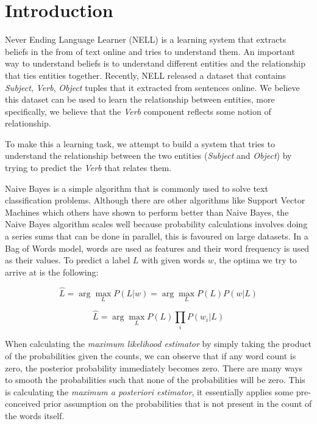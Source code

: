 \section{Introduction}

Never Ending Language Learner (NELL) is a learning system that extracts beliefs in the from of text online and tries to understand them. An important way to understand beliefs is to understand different entities and the relationship that ties entities together. Recently, NELL released a dataset that contains \emph{Subject}, \emph{Verb}, \emph{Object} tuples that it extracted from sentences online. We believe this dataset can be used to learn the relationship between entities, more specifically, we believe that the \emph{Verb} component reflects some notion of relationship.

To make this a learning task, we attempt to build a system that tries to understand the relationship between the two entities (\emph{Subject} and \emph{Object}) by trying to predict the \emph{Verb} that relates them.

Naive Bayes is a simple algorithm that is commonly used to solve text classification problems. Although there are other algorithms like Support Vector Machines which others have shown to perform better than Naive Bayes, the Naive Bayes algorithm scales well because probability calculations involves doing a series sums that can be done in parallel, this is favoured on large datasets. In a Bag of Words model, words are used as features and their word frequency is used as their values. To predict a label $L$ with given words $w$, the optima we try to arrive at is the following:

\begin{equation}
	\hat{L} = \arg\max_L P(L|w) = \arg\max_L P(L)P(w|L)
\end{equation}

\begin{equation}
	\hat{L} = \arg\max_L P(L) \prod_i{P(w_i|L)}
\end{equation}

When calculating the \emph{maximum likelihood estimator} by simply taking the product of the probabilities given the counts, we can observe that if any word count is zero, the posterior probability immediately becomes zero. There are many ways to smooth the probabilities such that none of the probabilities will be zero. This is calculating the \emph{maximum a posteriori estimator}, it essentially applies some pre-conceived prior assumption on the probabilities that is not present in the count of the words itself.

